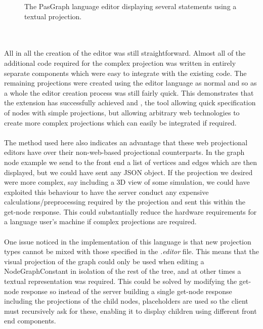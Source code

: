 \documentclass{article}
\begin{document}
{\begin{figure}[h!]
  \caption{The PasGraph language editor displaying several statements using a textual projection.}
  \label{fig:pasgraphUI1}
\end{figure}
\\
\\
All in all the creation of the editor was still straightforward. Almost all of the additional code required for the complex projection was written in entirely separate components which were easy to integrate with the existing code. The remaining projections were created using the editor language as normal and so as a whole the editor creation process was still fairly quick. This demonstrates that the extension has successfully achieved \RSetup and \RCustom, the tool allowing quick specification of nodes with simple projections, but allowing arbitrary web technologies to create more complex projections which can easily be integrated if required. 
\\
\\
The method used here also indicates an advantage that these web projectional editors have over their non-web-based projectional counterparts. In the graph node example we send to the front end a list of vertices and edges which are then displayed, but we could have sent any JSON object. If the projection we desired were more complex, say including a 3D view of some simulation, we could have exploited this behaviour to have the server conduct any expensive calculations/preprocessing required by the projection and sent this within the get-node response. This could substantially reduce the hardware requirements for a language user's machine if complex projections are required.
\\
\\
One issue noticed in the implementation of this language is that new projection types cannot be mixed with those specified in the \emph{.editor} file. This means that the visual projection of the graph could only be used when editing a NodeGraphConstant in isolation of the rest of the tree, and at other times a textual representation was required. This could be solved by modifying the get-node response so instead of the server building a single get-node response including the projections of the child nodes, placeholders are used so the client must recursively ask for these, enabling it to display children using different front end components.
%
%
}
\end{document}

